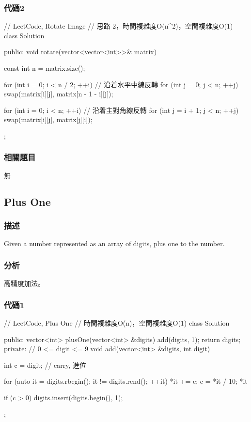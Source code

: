 \subsubsection{代碼2}
\begin{Code}
// LeetCode, Rotate Image
// 思路 2，時間複雜度O(n^2)，空間複雜度O(1)
class Solution {
public:
    void rotate(vector<vector<int>>& matrix) {
        const int n = matrix.size();

        for (int i = 0; i < n / 2; ++i) // 沿着水平中線反轉
            for (int j = 0; j < n; ++j)
                swap(matrix[i][j], matrix[n - 1 - i][j]);

        for (int i = 0; i < n; ++i)  // 沿着主對角線反轉
            for (int j = i + 1; j < n; ++j)
                swap(matrix[i][j], matrix[j][i]);
    }
};
\end{Code}


\subsubsection{相關題目}
\begindot
\item 無
\myenddot


\subsection{Plus One} %
\label{sec:plus-one}


\subsubsection{描述}
Given a number represented as an array of digits, plus one to the number.


\subsubsection{分析}
高精度加法。


\subsubsection{代碼1}
\begin{Code}
// LeetCode, Plus One
// 時間複雜度O(n)，空間複雜度O(1)
class Solution {
public:
    vector<int> plusOne(vector<int> &digits) {
        add(digits, 1);
        return digits;
    }
private:
    // 0 <= digit <= 9
    void add(vector<int> &digits, int digit) {
        int c = digit;  // carry, 進位

        for (auto it = digits.rbegin(); it != digits.rend(); ++it) {
            *it += c;
            c = *it / 10;
            *it %
        }

        if (c > 0) digits.insert(digits.begin(), 1);
    }
};
\end{Code}


